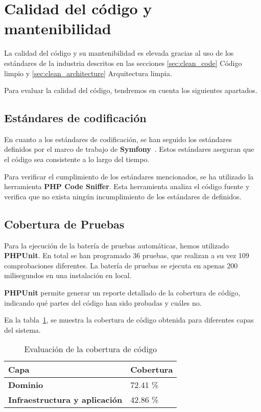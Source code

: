 \section{Calidad del código y mantenibilidad}

La calidad del código y su mantenibilidad es elevada gracias al uso de los estándares de la industria descritos en las
secciones \ref{sec:clean_code} Código limpio y \ref{sec:clean_architecture} Arquitectura limpia.

Para evaluar la calidad del código, tendremos en cuenta los siguientes apartados.

\subsection*{Estándares de codificación}

En cuanto a los estándares de codificación, se han seguido los estándares definidos por el marco de trabajo de
\textbf{Symfony}~\cite{url_symfony_code_standards}.
Estos estándares aseguran que el código sea consistente a lo largo del tiempo.

Para verificar el cumplimiento de los estándares mencionados, se ha utilizado la herramienta \textbf{PHP Code Sniffer}.
Esta herramienta analiza el código fuente y verifica que no exista ningún incumplimiento de los estándares de
definidos.

\subsection*{Cobertura de Pruebas}

Para la ejecución de la batería de pruebas automáticas, hemos utilizado \textbf{PHPUnit}.
En total se han programado 36 pruebas, que realizan a su vez 109 comprobaciones diferentes.
La batería de pruebas se ejecuta en apenas 200 milisegundos en una instalación en local.

\textbf{PHPUnit} permite generar un reporte detallado de la cobertura de código, indicando qué partes del código han
sido probadas y cuáles no.

En la tabla~\ref{tab:phpunit_report}, se muestra la cobertura de código obtenida para diferentes capas del sistema.

\begin{table}[h]
    \renewcommand{\arraystretch}{1.5}
    \setlength{\tabcolsep}{10pt}
    \begin{tabular}{>{\bfseries}p{} p{}}
        \toprule
        \textbf{Capa}                         & \textbf{Cobertura} \\
        \midrule
        \textbf{Dominio}                      & 72.41 \%           \\
        \textbf{Infraestructura y aplicación} & 42.86 \%           \\
        \bottomrule
    \end{tabular}
    \caption{Evaluación de la cobertura de código}
    \label{tab:phpunit_report}
\end{table}

